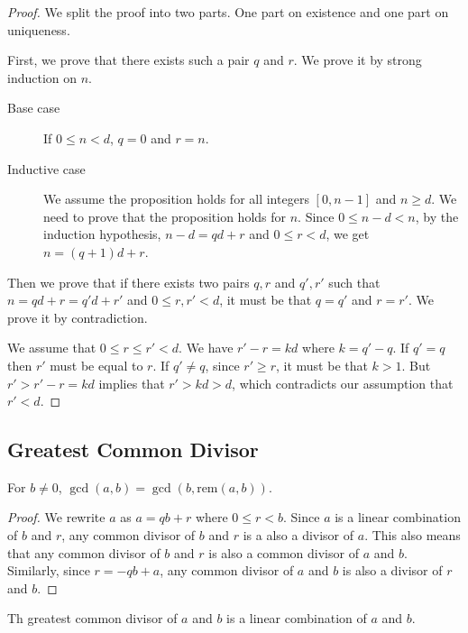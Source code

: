 \documentclass[11pt]{article}
\newcommand{\rem}{\mathrm{rem}}
\begin{document}
\begin{proof}
We split the proof into two parts. One part on existence and one part on uniqueness.

First, we prove that there exists such a pair $q$ and $r$. We prove it by strong induction
on $n$.

\begin{description}
\item[Base case] If $0 \leq n < d$, $q = 0$ and $r = n$.
\item[Inductive case] We assume the proposition holds for all integers $[0,n-1]$ and
$n \geq d$. We need to prove that the proposition holds for $n$. Since $0 \leq n-d < n$,
by the induction hypothesis, $n-d=qd+r$ and $0 \leq r < d$, we get $n=(q+1)d+r$.
\end{description}

Then we prove that if there exists two pairs $q,r$ and $q',r'$ such that $n=qd+r=q'd+r'$
and $0 \leq r,r' < d$, it must be that $q=q'$ and $r=r'$. We prove it by contradiction.

We assume that $0 \leq r \leq r' < d$. We have $r'-r=kd$ where $k = q'-q$. If $q'=q$ then
$r'$ must be equal to $r$. If $q' \neq q$, since $r' \geq r$, it must be that $k > 1$.
But $r' > r'-r=kd$ implies that $r' > kd > d$, which contradicts our assumption that
$r' < d$.
\end{proof}

\subsection{Greatest Common Divisor}

\begin{lemma} \label{lemma:6}
For $b \neq 0$, $\gcd(a,b) = \gcd(b,\rem(a,b))$.
\end{lemma}

\begin{proof}
We rewrite $a$ as $a = qb+r$ where $0 \leq r < b$. Since $a$ is a linear combination of $b$
and $r$, any common divisor of $b$ and $r$ is a also a divisor of $a$. This also means that
any common divisor of $b$ and $r$ is also a common divisor of $a$ and $b$. Similarly, since
$r = -qb+a$, any common divisor of $a$ and $b$ is also a divisor of $r$ and $b$.
\end{proof}

\begin{theorem} \label{theorem:7}
Th greatest common divisor of $a$ and $b$ is a linear combination of $a$ and $b$.
\end{theorem}
\end{document}
